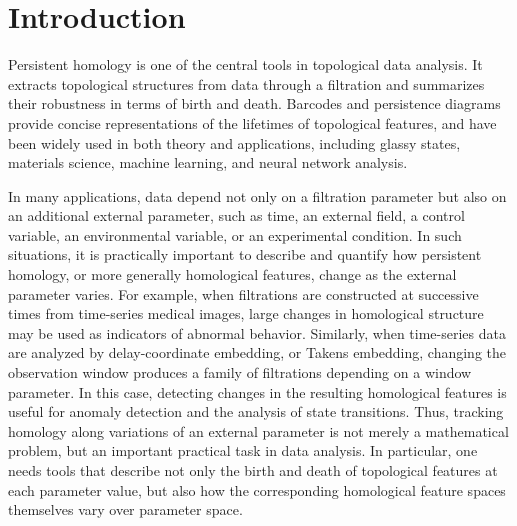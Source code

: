 \documentclass[pdflatex,sn-mathphys-num]{sn-jnl}%
\theoremstyle{thmstyleone}%
\theoremstyle{thmstyletwo}%
\theoremstyle{thmstylethree}%
\begin{document}
\section{Introduction}

Persistent homology \cite{edelsbrunner2002topological,zomorodian2004computing,cohen2005stability,edelsbrunner2008persistent,otter2017roadmap} is one of the central tools in topological data analysis. It extracts topological structures from data through a filtration and summarizes their robustness in terms of birth and death. Barcodes and persistence diagrams provide concise representations of the lifetimes of topological features, and have been widely used in both theory and applications, including glassy states\cite{obayashi2022persistent,nakamura2015persistent,hiraoka2016hierarchical}, materials science, machine learning, and neural network analysis\cite{moor2020topological,vandaele2021topologically,gabrielsson2020topology,hofer2020graph,adams2017persistence,hofer2017deep,bubenik2020persistence,chazal2014stochastic,kalivsnik2019tropical}.

In many applications, data depend not only on a filtration parameter but also on an additional external parameter, such as time, an external field, a control variable, an environmental variable, or an experimental condition. In such situations, it is practically important to describe and quantify how persistent homology, or more generally homological features, change as the external parameter varies. For example, when filtrations are constructed at successive times from time-series medical images, large changes in homological structure may be used as indicators of abnormal behavior. Similarly, when time-series data are analyzed by delay-coordinate embedding, or Takens embedding, changing the observation window produces a family of filtrations depending on a window parameter. In this case, detecting changes in the resulting homological features is useful for anomaly detection and the analysis of state transitions. Thus, tracking homology along variations of an external parameter is not merely a mathematical problem, but an important practical task in data analysis. In particular, one needs tools that describe not only the birth and death of topological features at each parameter value, but also how the corresponding homological feature spaces themselves vary over parameter space.
\end{document}
